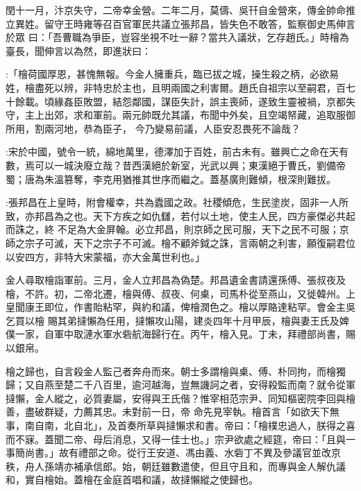 \begin{pinyinscope}
 閏十一月，汴京失守，二帝幸金營。二年二月，莫儔、吳幵自金營來，傳金帥命推立異姓。留守王時雍等召百官軍民共議立張邦昌，皆失色不敢答，監察御史馬伸言於眾
 曰：「吾曹職為爭臣，豈容坐視不吐一辭？當共入議狀，乞存趙氏。」時檜為臺長，聞伸言以為然，即進狀曰：



 :「檜荷國厚恩，甚愧無報。今金人擁重兵，臨已拔之城，操生殺之柄，必欲易姓，檜盡死以辨，非特忠於主也，且明兩國之利害爾。趙氏自祖宗以至嗣君，百七十餘載。頃緣姦臣敗盟，結怨鄰國，謀臣失計，誤主喪師，遂致生靈被禍，京都失守，主上出郊，求和軍前。兩元帥既允其議，布聞中外矣，且空竭帑藏，追取服御所用，割兩河地，恭為臣子，
 今乃變易前議，人臣安忍畏死不論哉？



 :宋於中國，號令一統，綿地萬里，德澤加于百姓，前古未有。雖興亡之命在天有數，焉可以一城決廢立哉？昔西漢絕於新室，光武以興；東漢絕于曹氏，劉備帝蜀；唐為朱溫篡奪，李克用猶推其世序而繼之。蓋基廣則難傾，根深則難拔。



 :張邦昌在上皇時，附會權幸，共為蠹國之政。社稷傾危，生民塗炭，固非一人所致，亦邦昌為之也。天下方疾之如仇讎，若付以土地，使主人民，四方豪傑必共起而誅之，終
 不足為大金屏翰。必立邦昌，則京師之民可服，天下之民不可服；京師之宗子可滅，天下之宗子不可滅。檜不顧斧鉞之誅，言兩朝之利害，願復嗣君位以安四方，非特大宋蒙福，亦大金萬世利也。」



 金人尋取檜詣軍前。三月，金人立邦昌為偽楚。邦昌遺金書請還孫傅、張叔夜及檜，不許。初，二帝北遷，檜與傅、叔夜、何㮚，司馬朴從至燕山，又徙韓州。上皇聞康王即位，作書貽粘罕，與約和議，俾檜潤色之。檜以厚賂達粘罕。會金主吳乞買以檜
 賜其弟撻懶為任用，撻懶攻山陽，建炎四年十月甲辰，檜與妻王氏及婢僕一家，自軍中取漣水軍水砦航海歸行在。丙午，檜入見。丁未，拜禮部尚書，賜以銀帛。



 檜之歸也，自言殺金人監己者奔舟而來。朝士多謂檜與㮚、傅、朴同拘，而檜獨歸；又自燕至楚二千八百里，逾河越海，豈無譏訶之者，安得殺監而南？就令從軍撻懶，金人縱之，必質妻屬，安得與王氏偕？惟宰相范宗尹、同知樞密院李回與檜善，盡破群疑，力薦其忠。未對前一日，帝
 命先見宰執。檜首言「如欲天下無事，南自南，北自北」，及首奏所草與撻懶求和書。帝曰：「檜樸忠過人，朕得之喜而不寐。蓋聞二帝、母后消息，又得一佳士也。」宗尹欲處之經筵，帝曰：「且與一事簡尚書。」故有禮部之命。從行王安道、馮由義、水砦丁不異及參議官並改京秩，舟人孫靖亦補承信郎。始，朝廷雖數遣使，但且守且和，而專與金人解仇議和，實自檜始。蓋檜在金庭首唱和議，故撻懶縱之使歸也。




\end{pinyinscope}
